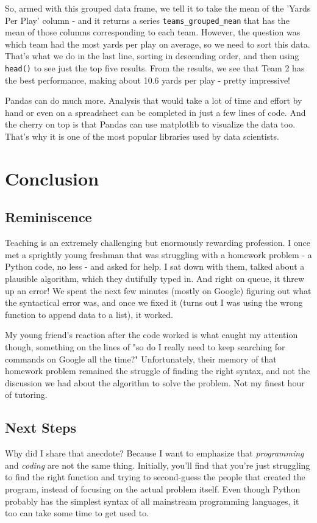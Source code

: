 \documentclass[12pt]{article}
\newcommand{\code}{\texttt}
\begin{document}
So, armed with this grouped data frame, we tell it to take the mean of the 'Yards Per Play' column - and it returns a series \code{teams\_grouped\_mean} that has the mean of those columns corresponding to each team. However, the question was which team had the most yards per play on average, so we need to sort this data. That's what we do in the last line, sorting in descending order, and then using \code{head()} to see just the top five results. From the results, we see that Team 2 has the best performance, making about 10.6 yards per play - pretty impressive!

Pandas can do much more. Analysis that would take a lot of time and effort by hand or even on a spreadsheet can be completed in just a few lines of code. And the cherry on top is that Pandas can use matplotlib to visualize the data too. That's why it is one of the most popular libraries used by data scientists. 

\newpage
\section{Conclusion}
\subsection{Reminiscence}
Teaching is an extremely challenging but enormously rewarding profession. I once met a sprightly young freshman that was struggling with a homework problem - a Python code, no less - and asked for help. I sat down with them, talked about a plausible algorithm, which they dutifully typed in. And right on queue, it threw up an error! We spent the next few minutes (mostly on Google) figuring out what the syntactical error was, and once we fixed it (turns out I was using the wrong function to append data to a list), it worked. 

My young friend's reaction after the code worked is what caught my attention though, something on the lines of "so do I really need to keep searching for commands on Google all the time?" Unfortunately, their memory of that homework problem remained the struggle of finding the right syntax, and not the discussion we had about the algorithm to solve the problem. Not my finest hour of tutoring. 

\subsection{Next Steps}
Why did I share that anecdote? Because I want to emphasize that \textit{programming} and \textit{coding} are not the same thing. Initially, you'll find that you're just struggling to find the right function and trying to second-guess the people that created the program, instead of focusing on the actual problem itself. Even though Python probably has the simplest syntax of all mainstream programming languages, it too can take some time to get used to. 
\end{document}
